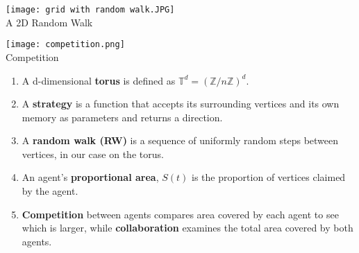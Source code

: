 \documentclass[landscape,fontscale=.5,paperwidth=36in,paperheight=24in]{baposter} %
\begin{document}
\begin{poster}
{\begin{multicols}{3}
			\begin{center}
				\texttt{[image: grid with random walk.JPG]}
				\\A 2D Random Walk
			\end{center}

			\begin{center}
				\texttt{[image: competition.png]}
				\\Competition
			\end{center}
		\end{multicols}

		\begin{enumerate}[$\bullet$]\setlength{\itemsep}{1pt}
			\item A d-dimensional \textbf{torus} is defined as $\mathbb{T}^d=(\mathbb{Z}/n\mathbb{Z})^d$.

			\item A \textbf{strategy} is a function that accepts its surrounding vertices and its own memory as parameters and returns a direction.

			\item A \textbf{random walk (RW)} is a sequence of uniformly random steps between vertices, in our case on the torus.

			\item An agent's \textbf{proportional area}, $S(t)$ is the proportion of vertices claimed by the agent. 

			\item \textbf{Competition} between agents compares area covered by each agent to see which is larger, while \textbf{collaboration} examines the total area covered by both agents.
		\end{enumerate}
		\smallskip
		
	}

\end{poster}
\end{document}
